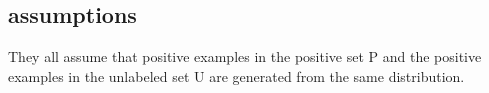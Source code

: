\subsection{assumptions}
They all assume that positive examples in the positive set P and the positive examples in
the unlabeled set U are generated from the same distribution.


%
%
%
%
%
